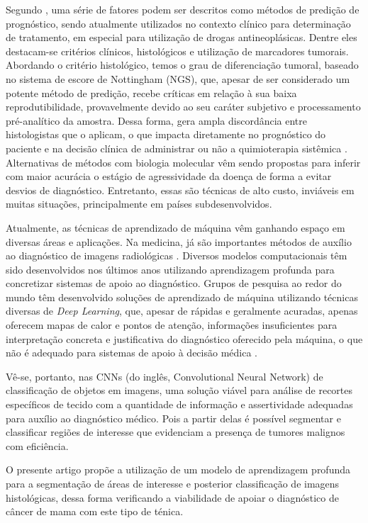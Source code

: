 \documentclass[12pt]{article}
\begin{document}
Segundo , uma série de fatores podem ser descritos como métodos de predição de prognóstico, sendo atualmente utilizados no contexto clínico para determinação de tratamento, em especial para utilização de drogas antineoplásicas. Dentre eles destacam-se critérios clínicos, histológicos e utilização de marcadores tumorais. Abordando o critério histológico, temos o grau de diferenciação tumoral, baseado no sistema de escore de Nottingham (NGS), que, apesar de ser considerado um potente método de predição, recebe críticas em relação à sua baixa reprodutibilidade, provavelmente devido ao seu caráter subjetivo e processamento pré-analítico da amostra. Dessa forma, gera ampla discordância entre histologistas que o aplicam, o que impacta diretamente no prognóstico do paciente e na decisão clínica de administrar ou não a quimioterapia sistêmica \cite{tiezzi2020}.
Alternativas de métodos com biologia molecular vêm sendo propostas para inferir com maior acurácia o estágio de agressividade da doença de forma a evitar desvios de diagnóstico. Entretanto, essas são técnicas de alto custo, inviáveis em muitas situações, principalmente em países subdesenvolvidos.

Atualmente, as técnicas de aprendizado de máquina vêm ganhando espaço em diversas áreas e aplicações. Na medicina, já são importantes métodos de auxílio ao diagnóstico de imagens radiológicas \cite{hu2018}. Diversos modelos computacionais têm sido desenvolvidos nos últimos anos utilizando aprendizagem profunda para concretizar sistemas de apoio ao diagnóstico. Grupos de pesquisa ao redor do mundo têm desenvolvido soluções de aprendizado de máquina utilizando técnicas diversas de {\it Deep Learning}, que, apesar de rápidas e geralmente acuradas, apenas oferecem mapas de calor e pontos de atenção, informações insuficientes para interpretação concreta e justificativa do diagnóstico oferecido pela máquina, o que não é adequado para sistemas de apoio à decisão médica \cite{li2021}.

Vê-se, portanto, nas CNNs (do inglês, Convolutional Neural Network) de classificação de objetos em imagens, uma solução viável para análise de recortes específicos de tecido com a quantidade de informação e assertividade adequadas para auxílio ao diagnóstico médico. Pois a partir delas é possível segmentar e classificar regiões de interesse que evidenciam a presença de tumores malignos com eficiência.

O presente artigo propõe a utilização de um modelo de aprendizagem profunda para a segmentação de áreas de interesse e posterior classificação de imagens histológicas, dessa forma verificando a viabilidade de apoiar o diagnóstico de câncer de mama com este tipo de ténica.
\end{document}

